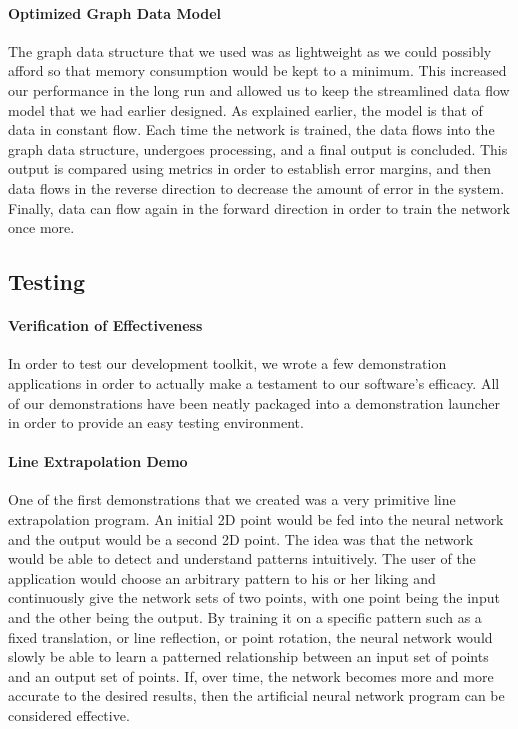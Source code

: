 \documentclass[letterpaper, 10pt]{article}
\begin{document}
		\paragraph{Optimized Graph Data Model}
		The graph data structure that we used was as lightweight as we could possibly afford so that memory consumption would be kept to a minimum. This increased our performance in the long run and allowed us to keep the streamlined data flow model that we had earlier designed. As explained earlier, the model is that of data in constant flow. Each time the network is trained, the data flows into the graph data structure, undergoes processing, and a final output is concluded. This output is compared using metrics in order to establish error margins, and then data flows in the reverse direction to decrease the amount of error in the system. Finally, data can flow again in the forward direction in order to train the network once more.
	\subsection{Testing}
		\paragraph{Verification of Effectiveness}
		In order to test our development toolkit, we wrote a few demonstration applications in order to actually make a testament to our software's efficacy. All of our demonstrations have been neatly packaged into a demonstration launcher in order to provide an easy testing environment. 
		
		\paragraph{Line Extrapolation Demo}
		One of the first demonstrations that we created was a very primitive line extrapolation program. An initial 2D point would be fed into the neural network and the output would be a second 2D point. The idea was that the network would be able to detect and understand patterns intuitively. The user of the application would choose an arbitrary pattern to his or her liking and continuously give the network sets of two points, with one point being the input and the other being the output. By training it on a specific pattern such as a fixed translation, or line reflection, or point rotation, the neural network would slowly be able to learn a patterned relationship between an input set of points and an output set of points. If, over time, the network becomes more and more accurate to the desired results, then the artificial neural network program can be considered effective.
		
\end{document}
